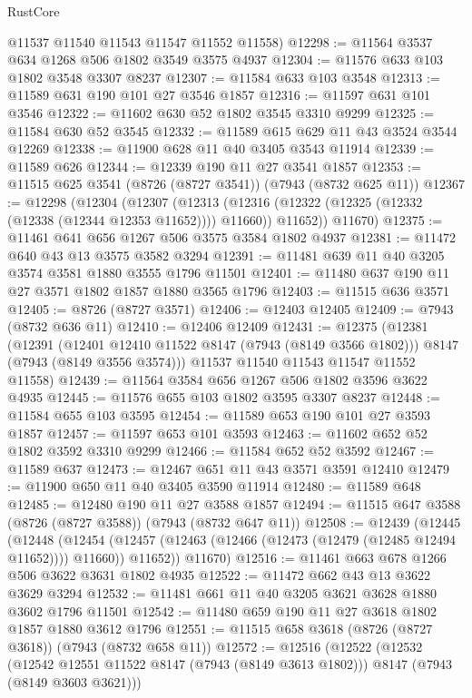 \begin{lexlean}{RustCore}
\begin{coremodule}
      @11537
      @11540
      @11543
      @11547
      @11552
      @11558)
@12298 := @11564 @3537 @634 @1268 @506 @1802 @3549 @3575 @4937
@12304 := @11576 @633 @103 @1802 @3548 @3307 @8237
@12307 := @11584 @633 @103 @3548
@12313 := @11589 @631 @190 @101 @27 @3546 @1857
@12316 := @11597 @631 @101 @3546
@12322 := @11602 @630 @52 @1802 @3545 @3310 @9299
@12325 := @11584 @630 @52 @3545
@12332 := @11589 @615 @629 @11 @43 @3524 @3544 @12269
@12338 := @11900 @628 @11 @40 @3405 @3543 @11914
@12339 := @11589 @626
@12344 := @12339 @190 @11 @27 @3541 @1857
@12353 := @11515 @625 @3541 (@8726 (@8727 @3541)) (@7943 (@8732 @625 @11))
@12367 := @12298
    (@12304
      (@12307
        (@12313 (@12316 (@12322 (@12325 (@12332 (@12338 (@12344 @12353 @11652)))) @11660)) @11652))
      @11670)
@12375 := @11461 @641 @656 @1267 @506 @3575 @3584 @1802 @4937
@12381 := @11472 @640 @43 @13 @3575 @3582 @3294
@12391 := @11481 @639 @11 @40 @3205 @3574 @3581 @1880 @3555 @1796 @11501
@12401 := @11480 @637 @190 @11 @27 @3571 @1802 @1857 @1880 @3565 @1796
@12403 := @11515 @636 @3571
@12405 := @8726 (@8727 @3571)
@12406 := @12403 @12405
@12409 := @7943 (@8732 @636 @11)
@12410 := @12406 @12409
@12431 := @12375
    (@12381
      (@12391
        (@12401 @12410 @11522 @8147 (@7943 (@8149 @3566 @1802)))
        @8147
        (@7943 (@8149 @3556 @3574)))
      @11537
      @11540
      @11543
      @11547
      @11552
      @11558)
@12439 := @11564 @3584 @656 @1267 @506 @1802 @3596 @3622 @4935
@12445 := @11576 @655 @103 @1802 @3595 @3307 @8237
@12448 := @11584 @655 @103 @3595
@12454 := @11589 @653 @190 @101 @27 @3593 @1857
@12457 := @11597 @653 @101 @3593
@12463 := @11602 @652 @52 @1802 @3592 @3310 @9299
@12466 := @11584 @652 @52 @3592
@12467 := @11589 @637
@12473 := @12467 @651 @11 @43 @3571 @3591 @12410
@12479 := @11900 @650 @11 @40 @3405 @3590 @11914
@12480 := @11589 @648
@12485 := @12480 @190 @11 @27 @3588 @1857
@12494 := @11515 @647 @3588 (@8726 (@8727 @3588)) (@7943 (@8732 @647 @11))
@12508 := @12439
    (@12445
      (@12448
        (@12454 (@12457 (@12463 (@12466 (@12473 (@12479 (@12485 @12494 @11652)))) @11660)) @11652))
      @11670)
@12516 := @11461 @663 @678 @1266 @506 @3622 @3631 @1802 @4935
@12522 := @11472 @662 @43 @13 @3622 @3629 @3294
@12532 := @11481 @661 @11 @40 @3205 @3621 @3628 @1880 @3602 @1796 @11501
@12542 := @11480 @659 @190 @11 @27 @3618 @1802 @1857 @1880 @3612 @1796
@12551 := @11515 @658 @3618 (@8726 (@8727 @3618)) (@7943 (@8732 @658 @11))
@12572 := @12516
    (@12522
      (@12532
        (@12542 @12551 @11522 @8147 (@7943 (@8149 @3613 @1802)))
        @8147
        (@7943 (@8149 @3603 @3621)))

\end{coremodule}
\end{lexlean}

